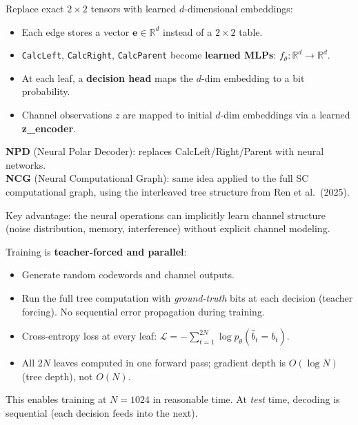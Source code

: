 \documentclass[11pt]{article}
\begin{document}
\begin{concept}[title=5. The Neural Replacement (NPD / NCG)]
Replace exact $2 \times 2$ tensors with learned $d$-dimensional embeddings:
\begin{itemize}[nosep]
  \item Each edge stores a vector $\mathbf{e} \in \mathbb{R}^d$ instead of a $2 \times 2$ table.
  \item \texttt{CalcLeft}, \texttt{CalcRight}, \texttt{CalcParent} become \textbf{learned MLPs}: $f_\theta: \mathbb{R}^d \to \mathbb{R}^d$.
  \item At each leaf, a \textbf{decision head} maps the $d$-dim embedding to a bit probability.
  \item Channel observations $z$ are mapped to initial $d$-dim embeddings via a learned \textbf{z\_encoder}.
\end{itemize}

\textbf{NPD} (Neural Polar Decoder): replaces CalcLeft/Right/Parent with neural networks.\\
\textbf{NCG} (Neural Computational Graph): same idea applied to the full SC computational graph, using the interleaved tree structure from Ren et al.\ (2025).

Key advantage: the neural operations can implicitly learn channel structure (noise distribution, memory, interference) without explicit channel modeling.
\end{concept}

\begin{concept}[title=6. Training: \texttt{fast\_ce}]
Training is \textbf{teacher-forced and parallel}:
\begin{itemize}[nosep]
  \item Generate random codewords and channel outputs.
  \item Run the full tree computation with \emph{ground-truth} bits at each decision (teacher forcing). No sequential error propagation during training.
  \item Cross-entropy loss at every leaf: $\mathcal{L} = -\sum_{t=1}^{2N} \log p_\theta(\hat{b}_t = b_t)$.
  \item All $2N$ leaves computed in one forward pass; gradient depth is $O(\log N)$ (tree depth), not $O(N)$.
\end{itemize}
This enables training at $N = 1024$ in reasonable time. At \emph{test} time, decoding is sequential (each decision feeds into the next).
\end{concept}
\end{document}
